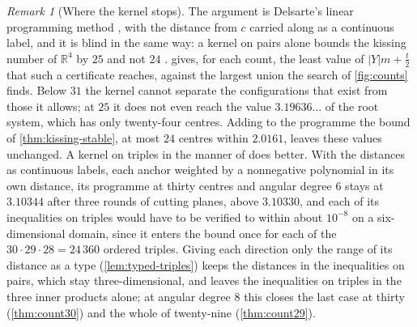 \documentclass[11pt,reqno]{amsart}
\renewcommand{\_}{\origunderscore\allowbreak}
\numberwithin{equation}{section}
\theoremstyle{plain}
\theoremstyle{definition}
\theoremstyle{remark}
\newtheorem{remark}[thm]{Remark}
\begin{document}
\begin{remark}[Where the kernel stops]\label{rem:kernel-limit}
The argument is Delsarte's linear programming method \cite{DGS77}, with the
distance from $c$ carried along as a continuous label, and it is blind in
the same way: a kernel on pairs alone bounds the kissing number of
$\mathbb{R}^4$ by $25$ and not $24$ \cite{OS79}. 
gives, for each count, the least value of $|Y|m+\frac t2$ that such a
certificate reaches, against the largest union the search of
\cref{fig:counts} finds. Below $31$ the kernel cannot separate the
configurations that exist from those it allows; at $25$ it does not even
reach the value $3.19636\ldots$ of the root system, which has only
twenty-four centres. Adding to the programme the bound of
\cref{thm:kissing-stable}, at most $24$ centres within $2.0161$, leaves these
values unchanged.
A kernel on triples in the manner of \cite{BV08} does better. With the
distances as continuous labels, each anchor weighted by a nonnegative
polynomial in its own distance, its programme at thirty centres and angular
degree $6$ stays at $3.10344$ after three rounds of cutting planes, above
$3.10330$, and each of its inequalities on triples would have to be verified
to within about $10^{-8}$ on a six-dimensional domain, since it enters the
bound once for each of the $30\cdot29\cdot28=24\,360$ ordered triples.
Giving each direction only the range of its distance as a type
(\cref{lem:typed-triples}) keeps the distances in the inequalities on pairs,
which stay three-dimensional, and leaves the inequalities on triples in the
three inner products alone; at angular degree $8$ this closes the last case
at thirty (\cref{thm:count30}) and the whole of twenty-nine
(\cref{thm:count29}).
\end{remark}
\end{document}
